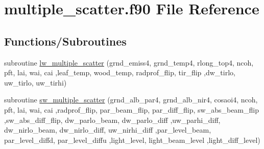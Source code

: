 \hypertarget{multiple__scatter_8f90}{}\section{multiple\+\_\+scatter.\+f90 File Reference}
\label{multiple__scatter_8f90}
\subsection*{Functions/\+Subroutines}
\begin{DoxyCompactItemize}
\item 
subroutine \hyperlink{multiple__scatter_8f90_abda35694b2f8582ddf43bbbe78a8725f}{lw\+\_\+multiple\+\_\+scatter} (grnd\+\_\+emiss4, grnd\+\_\+temp4, rlong\+\_\+top4, ncoh, pft, lai, wai, cai                                                                                                                                       ,leaf\+\_\+temp, wood\+\_\+temp, radprof\+\_\+flip, tir\+\_\+flip                                                                                                                                                                                           ,dw\+\_\+tirlo, uw\+\_\+tirlo, uw\+\_\+tirhi)
\item 
subroutine \hyperlink{multiple__scatter_8f90_a2a48cb88f4cbc8013f2b09b2fc878d1b}{sw\+\_\+multiple\+\_\+scatter} (grnd\+\_\+alb\+\_\+par4, grnd\+\_\+alb\+\_\+nir4, cosaoi4, ncoh, pft, lai, wai, cai                                                                                                                               ,radprof\+\_\+flip, par\+\_\+beam\+\_\+flip, par\+\_\+diff\+\_\+flip, sw\+\_\+abs\+\_\+beam\+\_\+flip                                                                                                                           ,sw\+\_\+abs\+\_\+diff\+\_\+flip, dw\+\_\+parlo\+\_\+beam, dw\+\_\+parlo\+\_\+diff                                                                                                                                                                               ,uw\+\_\+parhi\+\_\+diff, dw\+\_\+nirlo\+\_\+beam, dw\+\_\+nirlo\+\_\+diff, uw\+\_\+nirhi\+\_\+diff                                                                                                                                   ,par\+\_\+level\+\_\+beam, par\+\_\+level\+\_\+diffd, par\+\_\+level\+\_\+diffu                                                                                                                                                                       ,light\+\_\+level, light\+\_\+beam\+\_\+level                                                                                                                       ,light\+\_\+diff\+\_\+level)
\end{DoxyCompactItemize}


